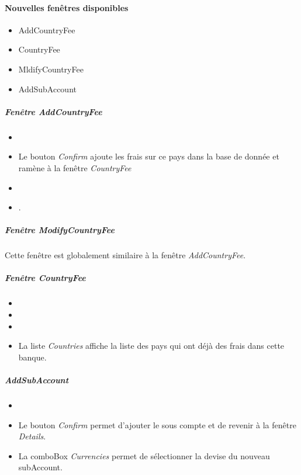 \paragraph{Nouvelles fenêtres disponibles}
\begin{itemize}
    \item AddCountryFee
    \item CountryFee
    \item MldifyCountryFee
    \item AddSubAccount
\end{itemize}

\subparagraph{Fenêtre \emph{AddCountryFee}}
\begin{itemize}
    \item {}
    \item Le bouton \emph{Confirm} ajoute les frais sur ce pays dans la base de donnée et ramène à la fenêtre \emph{CountryFee}
    \item {}
    \item {}.
\end{itemize}

\subparagraph{Fenêtre \emph{ModifyCountryFee}}
Cette fenêtre est globalement similaire à la fenêtre \emph{AddCountryFee}.

\subparagraph{Fenêtre \emph{CountryFee}}
\begin{itemize}
    \item {}
    \item {}
    \item {}
    \item La liste \emph{Countries} affiche la liste des pays qui ont déjà des frais dans cette banque.
\end{itemize}

\subparagraph{AddSubAccount}
\begin{itemize}
    \item {}
    \item Le bouton \emph{Confirm} permet d'ajouter le sous compte et de revenir à la fenêtre \emph{Details}.
    \item La comboBox \emph{Currencies} permet de sélectionner la devise du nouveau subAccount.
\end{itemize}